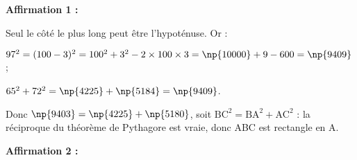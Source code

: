 
\medskip

%
%




%
\textbf{Affirmation 1 :}

Seul le côté le plus long peut être l'hypoténuse. Or :

$97^2 = (100 - 3)^2 = 100^2 + 3^2 - 2\times 100 \times 3 = \np{10000} + 9 - 600 = \np{9409}$ ;

$65^2 + 72^2 = \np{4225} + \np{5184} = \np{9409}$.

Donc $\np{9403} = \np{4225} + \np{5180}$, soit $\text{BC}^2 = \text{BA}^2 + \text{AC}^2$ : la réciproque du théorème de Pythagore est  vraie, donc ABC est  rectangle en A.
\medskip

\textbf{Affirmation 2 :} 


